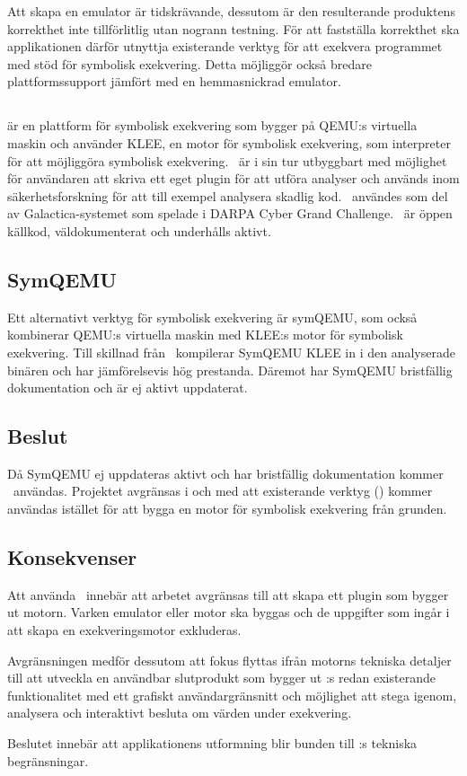 Att skapa en emulator är tidskrävande, dessutom är den resulterande produktens
korrekthet inte tillförlitlig utan nogrann testning. För att fastställa
korrekthet ska applikationen därför utnyttja existerande verktyg för att
exekvera programmet med stöd för symbolisk exekvering. Detta möjliggör också
bredare plattformssupport jämfört med en hemmasnickrad emulator.

\subsection{\stoe}

\stoe\cite{s2e} är en plattform för symbolisk exekvering som bygger på QEMU:s
virtuella maskin och använder KLEE\cite{klee}, en motor för symbolisk
exekvering, som interpreter för att möjliggöra symbolisk exekvering. \stoe\ är i
sin tur utbyggbart med möjlighet för användaren att skriva ett eget plugin för
att utföra analyser och används inom säkerhetsforskning för att till exempel
analysera skadlig kod. \stoe\ användes som del av Galactica-systemet som spelade
i DARPA Cyber Grand Challenge\cite{s2e_website}. \stoe\ är öppen källkod,
väldokumenterat och underhålls aktivt.

\subsection{SymQEMU}

Ett alternativt verktyg för symbolisk exekvering är symQEMU\cite{symqemu},
som också kombinerar QEMU:s virtuella maskin med KLEE:s motor för symbolisk
exekvering. Till skillnad från \stoe\ kompilerar SymQEMU KLEE in i den
analyserade binären och har jämförelsevis hög prestanda. Däremot har SymQEMU
bristfällig dokumentation och är ej aktivt uppdaterat.

\subsection{Beslut}

Då SymQEMU ej uppdateras aktivt och har bristfällig dokumentation kommer \stoe\
användas. Projektet avgränsas i och med att existerande verktyg (\stoe) kommer
användas istället för att bygga en motor för symbolisk exekvering från grunden.

\subsection{Konsekvenser}

Att använda \stoe\ innebär att arbetet avgränsas till att skapa ett plugin som
bygger ut motorn. Varken emulator eller motor ska byggas och de uppgifter som
ingår i att skapa en exekveringsmotor exkluderas.

Avgränsningen medför dessutom att fokus flyttas ifrån motorns tekniska detaljer
till att utveckla en användbar slutprodukt som bygger ut \stoe:s redan
existerande funktionalitet med ett grafiskt användargränsnitt och möjlighet att
stega igenom, analysera och interaktivt besluta om värden under exekvering.

Beslutet innebär att applikationens utformning blir bunden till \stoe:s tekniska
begränsningar.
